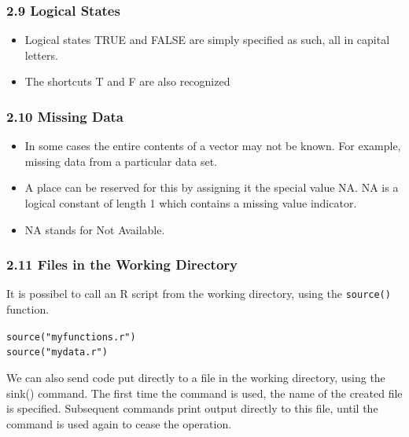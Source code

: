 \documentclass{beamer}
\begin{document}
 	\begin{frame} 
 		\frametitle{2.9 Logical States}
 		\begin{itemize}
 			\item Logical states TRUE and FALSE are simply specified as such, all in capital letters. 
 			\item The
 			shortcuts T and F are also recognized
 		\end{itemize}
 	\end{frame}
 	\begin{frame}
 		\frametitle{2.10 Missing Data}
 		\begin{itemize}
 			\item In some cases the entire contents of a vector may not be known. For example, missing data
 			from a particular data set. \item A place can be reserved for this by assigning it the special value
 			NA.
 			NA is a logical constant of length 1 which contains a missing value indicator.
 			\item  NA stands
 			for Not Available.
 		\end{itemize}
 	\end{frame}
 	\begin{frame}
 		
 		\frametitle{2.11 Files in the Working Directory}
 		It is possibel to call an R script from the working directory, using the \texttt{source()} function.
 		\begin{framed}
 			
 			\texttt{source("myfunctions.r")\\
 				source("mydata.r")}
 			
 		\end{framed} 
 		We can also send code put directly to a file in the working directory, using the sink()
 		command. The first time the command is used, the name of the created file is specified.
 		Subsequent commands print output directly to this file, until the command is used again to
 		cease the operation.
 	\end{frame}
\end{document}
